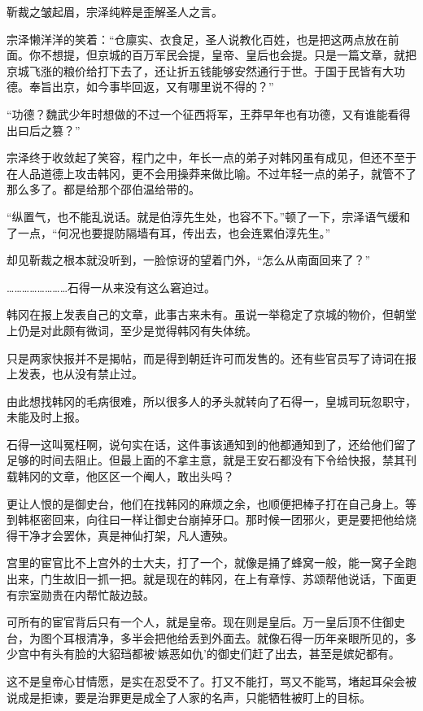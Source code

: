 靳裁之皱起眉，宗泽纯粹是歪解圣人之言。

宗泽懒洋洋的笑着：“仓廪实、衣食足，圣人说教化百姓，也是把这两点放在前面。你不想提，但京城的百万军民会提，皇帝、皇后也会提。只是一篇文章，就把京城飞涨的粮价给打下去了，还让折五钱能够安然通行于世。于国于民皆有大功德。奉旨出京，如今事毕回返，又有哪里说不得的？”

“功德？魏武少年时想做的不过一个征西将军，王莽早年也有功德，又有谁能看得出曰后之篡？”

宗泽终于收敛起了笑容，程门之中，年长一点的弟子对韩冈虽有成见，但还不至于在人品道德上攻击韩冈，更不会用操莽来做比喻。不过年轻一点的弟子，就管不了那么多了。都是给那个邵伯温给带的。

“纵置气，也不能乱说话。就是伯淳先生处，也容不下。”顿了一下，宗泽语气缓和了一点，“何况也要提防隔墙有耳，传出去，也会连累伯淳先生。”

却见靳裁之根本就没听到，一脸惊讶的望着门外，“怎么从南面回来了？”

……………………石得一从来没有这么窘迫过。

韩冈在报上发表自己的文章，此事古来未有。虽说一举稳定了京城的物价，但朝堂上仍是对此颇有微词，至少是觉得韩冈有失体统。

只是两家快报并不是揭帖，而是得到朝廷许可而发售的。还有些官员写了诗词在报上发表，也从没有禁止过。

由此想找韩冈的毛病很难，所以很多人的矛头就转向了石得一，皇城司玩忽职守，未能及时上报。

石得一这叫冤枉啊，说句实在话，这件事该通知到的他都通知到了，还给他们留了足够的时间去阻止。但最上面的不拿主意，就是王安石都没有下令给快报，禁其刊载韩冈的文章，他区区一个阉人，敢出头吗？

更让人恨的是御史台，他们在找韩冈的麻烦之余，也顺便把棒子打在自己身上。等到韩枢密回来，向往曰一样让御史台崩掉牙口。那时候一团邪火，更是要把他给烧得干净才会罢休，真是神仙打架，凡人遭殃。

宫里的宦官比不上宫外的士大夫，打了一个，就像是捅了蜂窝一般，能一窝子全跑出来，门生故旧一抓一把。就是现在的韩冈，在上有章惇、苏颂帮他说话，下面更有宗室勋贵在内帮忙敲边鼓。

可所有的宦官背后只有一个人，就是皇帝。现在则是皇后。万一皇后顶不住御史台，为图个耳根清净，多半会把他给丢到外面去。就像石得一历年亲眼所见的，多少宫中有头有脸的大貂珰都被‘嫉恶如仇’的御史们赶了出去，甚至是嫔妃都有。

这不是皇帝心甘情愿，是实在忍受不了。打又不能打，骂又不能骂，堵起耳朵会被说成是拒谏，要是治罪更是成全了人家的名声，只能牺牲被盯上的目标。


